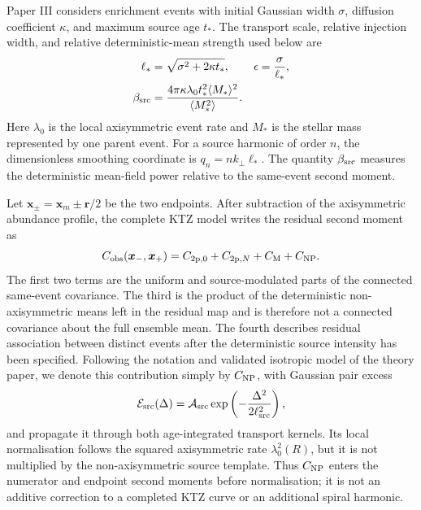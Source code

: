 \documentclass[fleqn,usenatbib]{mnras}
\newcommand{\bs}[1]{\boldsymbol{#1}}
\begin{document}
Paper III considers enrichment events with initial Gaussian width $\sigma$, diffusion coefficient $\kappa$, and maximum source age $t_\ast$.  The transport scale, relative injection width, and relative deterministic-mean strength used below are
\begin{align}
    \ell_\ast&=\sqrt{\sigma^2+2\kappa t_\ast},
    &\epsilon&=\frac{\sigma}{\ell_\ast},
    \label{eq:dimensionless_variables}
    \\
    \beta_{\rm src}
    &=\frac{4\pi\kappa\lambda_0t_\ast^2\langle M_\ast\rangle^2}
    {\langle M_\ast^2\rangle}.
    \label{eq:beta_src}
\end{align}
Here $\lambda_0$ is the local axisymmetric event rate and $M_\ast$ is the stellar mass represented by one parent event.  For a source harmonic of order $n$, the dimensionless smoothing coordinate is $q_n=nk_\perp\ell_\ast$.  The quantity $\beta_{\rm src}$ measures the deterministic mean-field power relative to the same-event second moment.

Let $\bs{x}_\pm=\bs{x}_m\pm\bs r/2$ be the two endpoints.  After subtraction of the axisymmetric abundance profile, the complete KTZ model writes the residual second moment as
\begin{equation}
    C_{\rm obs}(\bs{x}_-,\bs{x}_+)
    =C_{{\rm 2p},0}+C_{{\rm 2p},N}+C_{\rm M}+C_{\rm NP}.
    \label{eq:ktz_component_summary}
\end{equation}
The first two terms are the uniform and source-modulated parts of the connected same-event covariance.  The third is the product of the deterministic non-axisymmetric means left in the residual map and is therefore not a connected covariance about the full ensemble mean.  The fourth describes residual association between distinct events after the deterministic source intensity has been specified.  Following the notation and validated isotropic model of the theory paper, we denote this contribution simply by $C_{\rm NP}$, with Gaussian pair excess
\begin{equation}
    {\cal E}_{\rm src}(\Delta)
    ={\cal A}_{\rm src}
    \exp\left(-\frac{\Delta^2}{2\ell_{\rm src}^2}\right),
    \label{eq:Esrc_example}
\end{equation}
and propagate it through both age-integrated transport kernels.  Its local normalisation follows the squared axisymmetric rate $\lambda_0^2(R)$, but it is not multiplied by the non-axisymmetric source template.  Thus $C_{\rm NP}$ enters the numerator and endpoint second moments before normalisation; it is not an additive correction to a completed KTZ curve or an additional spiral harmonic.
\end{document}
